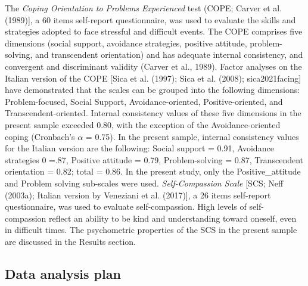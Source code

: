 \documentclass[
  english,
  man,floatsintext]{apa7}
\begin{document}
The \emph{Coping Orientation to Problems Experienced} test (COPE; Carver et al. (1989){]}, a 60 items self-report questionnaire, was used to evaluate the skills and strategies adopted to face stressful and difficult events. The COPE comprises five dimensions (social support, avoidance strategies, positive attitude, problem-solving, and transcendent orientation) and has adequate internal consistency, and convergent and discriminant validity (Carver et al., 1989).
Factor analyses on the Italian version of the COPE {[}Sica et al. (1997); Sica et al. (2008); sica2021facing{]} have demonstrated that the scales can be grouped into the following dimensions: Problem-focused, Social Support, Avoidance-oriented, Positive-oriented, and Transcendent-oriented. Internal consistency values of these five dimensions in the present sample exceeded 0.80, with the exception of the Avoidance-oriented coping (Cronbach's \(\alpha\) = 0.75). In the present sample, internal consistency values for the Italian version are the following: Social support = 0.91, Avoidance strategies 0 =.87, Positive attitude = 0.79, Problem-solving = 0.87, Transcendent orientation = 0.82; total = 0.86. In the present study, only the Positive\_attitude and Problem solving sub-scales were used.
\emph{Self-Compassion Scale} {[}SCS; Neff (2003a); Italian version by Veneziani et al. (2017){]}, a 26 items self-report questionnaire, was used to evaluate self-compassion. High levels of self-compassion reflect an ability to be kind and understanding toward oneself, even in difficult times. The psychometric properties of the SCS in the present sample are discussed in the Results section.

\hypertarget{data-analysis-plan}{%
\subsection{Data analysis plan}\label{data-analysis-plan}}
\end{document}
